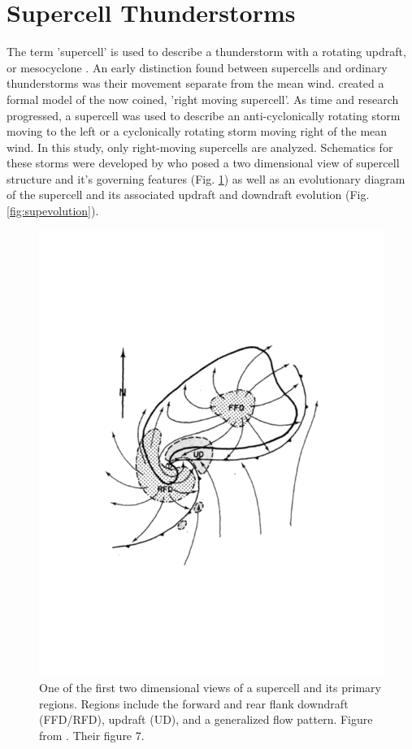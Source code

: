 \section{Supercell Thunderstorms}
The term 'supercell' is used to describe a thunderstorm with a rotating updraft, or mesocyclone \citep{browning1962sup}. An early distinction found between supercells and ordinary thunderstorms was their movement separate from the mean wind. \cite{browning1964airflow} created a formal model of the now coined, 'right moving supercell'. As time and research progressed, a supercell was used to describe an anti-cyclonically rotating storm moving to the left or a cyclonically rotating storm moving right of the mean wind. In this study, only right-moving supercells are analyzed. Schematics for these storms were developed by \cite{lemon1979severe} who posed a two dimensional view of supercell structure and it's governing features (Fig. \ref{fig:sup2d}) as well as an evolutionary diagram of the supercell and its associated updraft and downdraft evolution (Fig. \ref{fig:supevolution}). 

\begin{figure}[h!]
    \centering
    \includegraphics[width=1\textwidth]{figures/supercell_2d.png}
    \caption{One of the first two dimensional views of a supercell and its primary regions. Regions include the forward and rear flank downdraft (FFD/RFD), updraft (UD), and a generalized flow pattern. Figure from \cite{lemon1979severe}. Their figure 7.}
    \label{fig:sup2d}
\end{figure}

